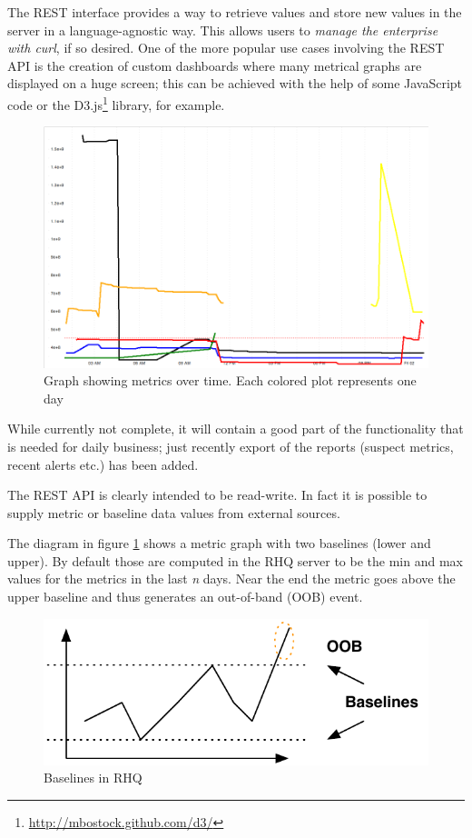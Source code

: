 \documentclass[twocolumn,10pt,a4paper]{article}
\begin{document}
The REST interface provides a way to retrieve values and store 
new values in the server in a language-agnostic way.
This allows users to \emph{manage the enterprise with curl}, if so desired. 
One of the more
popular use cases involving the REST API is the creation of custom dashboards where many metrical
graphs are displayed on a huge screen; this can be achieved with the help
of some JavaScript code or the D3.js\footnote{\url{http://mbostock.github.com/d3/}} library, for example.

\begin{figure}[h]
\noindent\includegraphics[width=\columnwidth]{graph/multigraph.png}
\caption{Graph showing metrics over time. Each colored plot represents one day}
\end{figure}

While currently not complete, it will contain a good part of the functionality
that is needed for daily business; just recently export of the reports (suspect metrics, recent alerts etc.) has been added. 

The REST API is clearly intended to be read-write. In fact it is possible to supply metric or baseline data values from external sources. 

The diagram in figure \ref{fig:baseline} shows a metric graph with two baselines (lower and upper). By default those are computed in the RHQ server to be the min and max values for the metrics in the last \emph{n} days. Near the end the metric goes above the upper baseline and thus generates an out-of-band (OOB) event.

\begin{figure}[h]
\noindent\includegraphics[width=\columnwidth]{graph/baseline_graph.pdf}
\caption{Baselines in RHQ}
\label{fig:baseline}
\end{figure}
\end{document}
